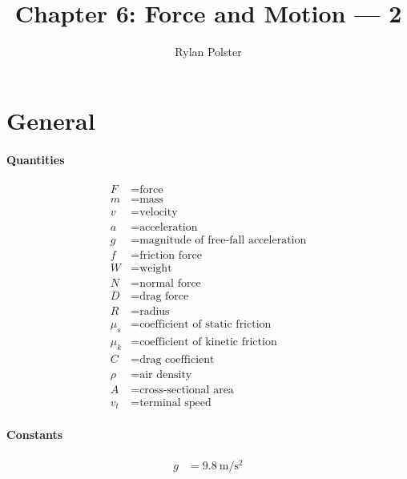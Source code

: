 \documentclass{article}
\title{Chapter 6: Force and Motion — 2}
\author{Rylan Polster}
\begin{document}
    \maketitle
    
    \section*{General}

        \paragraph{Quantities}
        \begin{align}
            F &= \text{force} \nonumber\\
            m &= \text{mass} \nonumber\\
            v &= \text{velocity} \nonumber\\
            a &= \text{acceleration} \nonumber\\
            g &= \text{magnitude of free-fall acceleration} \nonumber\\
            f &= \text{friction force} \nonumber\\
            W &= \text{weight} \nonumber\\
            N &= \text{normal force} \nonumber\\
            D &= \text{drag force} \nonumber\\
            R &= \text{radius} \nonumber\\
            \mu_s &= \text{coefficient of static friction} \nonumber\\
            \mu_k &= \text{coefficient of kinetic friction} \nonumber\\
            C &= \text{drag coefficient} \nonumber\\
            \rho &= \text{air density} \nonumber\\
            A &= \text{cross-sectional area} \nonumber\\
            v_t &= \text{terminal speed} \nonumber
        \end{align}

        \paragraph{Constants}
        \begin{align}
            g &= \SI[per-mode=symbol]{9.8}{\meter\per\square\second} \nonumber
        \end{align}
\end{document}
